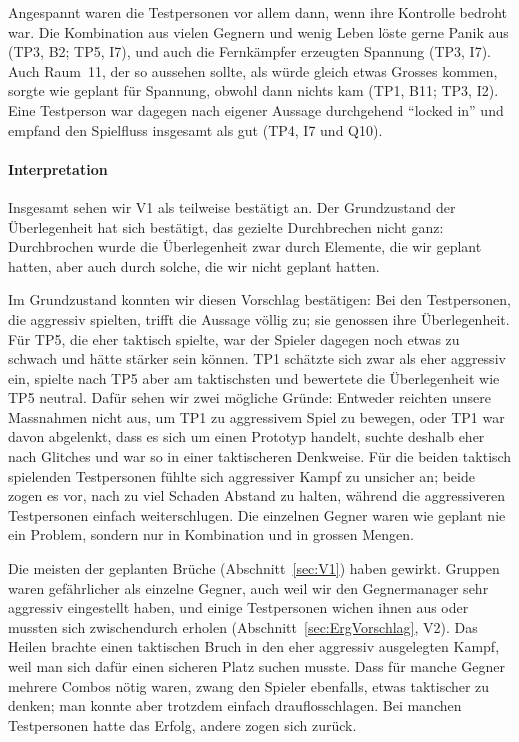 \documentclass[../Main.tex]{subfiles}
\begin{document}
Angespannt waren die Testpersonen vor allem dann, wenn ihre Kontrolle bedroht war. Die Kombination aus vielen Gegnern und wenig Leben löste gerne Panik aus (TP3, B2; TP5, I7), und auch die Fernkämpfer erzeugten Spannung (TP3, I7). Auch Raum~11, der so aussehen sollte, als würde gleich etwas Grosses kommen, sorgte wie geplant für Spannung, obwohl dann nichts kam (TP1, B11; TP3, I2). Eine Testperson war dagegen nach eigener Aussage durchgehend \enquote{locked in} und empfand den Spielfluss insgesamt als gut (TP4, I7 und Q10).

\paragraph{Interpretation}
Insgesamt sehen wir V1 als teilweise bestätigt an. Der Grundzustand der Überlegenheit hat sich bestätigt, das gezielte Durchbrechen nicht ganz: Durchbrochen wurde die Überlegenheit zwar durch Elemente, die wir geplant hatten, aber auch durch solche, die wir nicht geplant hatten.

Im Grundzustand konnten wir diesen Vorschlag bestätigen: Bei den Testpersonen, die aggressiv spielten, trifft die Aussage völlig zu; sie genossen ihre Überlegenheit. Für TP5, die eher taktisch spielte, war der Spieler dagegen noch etwas zu schwach und hätte stärker sein können. TP1 schätzte sich zwar als eher aggressiv ein, spielte nach TP5 aber am taktischsten und bewertete die Überlegenheit wie TP5 neutral. Dafür sehen wir zwei mögliche Gründe: Entweder reichten unsere Massnahmen nicht aus, um TP1 zu aggressivem Spiel zu bewegen, oder TP1 war davon abgelenkt, dass es sich um einen Prototyp handelt, suchte deshalb eher nach Glitches und war so in einer taktischeren Denkweise. Für die beiden taktisch spielenden Testpersonen fühlte sich aggressiver Kampf zu unsicher an; beide zogen es vor, nach zu viel Schaden Abstand zu halten, während die aggressiveren Testpersonen einfach weiterschlugen. Die einzelnen Gegner waren wie geplant nie ein Problem, sondern nur in Kombination und in grossen Mengen.

Die meisten der geplanten Brüche (Abschnitt~\ref{sec:V1}) haben gewirkt. Gruppen waren gefährlicher als einzelne Gegner, auch weil wir den Gegnermanager sehr aggressiv eingestellt haben, und einige Testpersonen wichen ihnen aus oder mussten sich zwischendurch erholen (Abschnitt~\ref{sec:ErgVorschlag}, V2). Das Heilen brachte einen taktischen Bruch in den eher aggressiv ausgelegten Kampf, weil man sich dafür einen sicheren Platz suchen musste. Dass für manche Gegner mehrere Combos nötig waren, zwang den Spieler ebenfalls, etwas taktischer zu denken; man konnte aber trotzdem einfach drauflosschlagen. Bei manchen Testpersonen hatte das Erfolg, andere zogen sich zurück.
\end{document}
